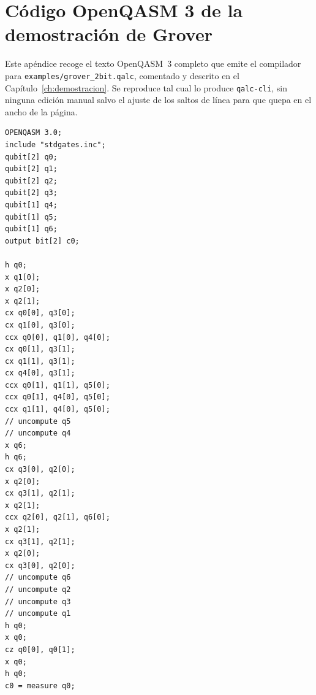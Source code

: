 \chapter{Código OpenQASM 3 de la demostración de Grover}
\label{ch:grover-qasm}

Este apéndice recoge el texto OpenQASM~3 completo que emite el compilador para \lstinline|examples/grover_2bit.qalc|, comentado y descrito en el Capítulo~\ref{ch:demostracion}. Se reproduce tal cual lo produce \lstinline|qalc-cli|, sin ninguna edición manual salvo el ajuste de los saltos de línea para que quepa en el ancho de la página.

\begin{lstlisting}[language={}, caption=Salida OpenQASM 3 completa de la demostración de Grover]
OPENQASM 3.0;
include "stdgates.inc";
qubit[2] q0;
qubit[2] q1;
qubit[2] q2;
qubit[2] q3;
qubit[1] q4;
qubit[1] q5;
qubit[1] q6;
output bit[2] c0;

h q0;
x q1[0];
x q2[0];
x q2[1];
cx q0[0], q3[0];
cx q1[0], q3[0];
ccx q0[0], q1[0], q4[0];
cx q0[1], q3[1];
cx q1[1], q3[1];
cx q4[0], q3[1];
ccx q0[1], q1[1], q5[0];
ccx q0[1], q4[0], q5[0];
ccx q1[1], q4[0], q5[0];
// uncompute q5
// uncompute q4
x q6;
h q6;
cx q3[0], q2[0];
x q2[0];
cx q3[1], q2[1];
x q2[1];
ccx q2[0], q2[1], q6[0];
x q2[1];
cx q3[1], q2[1];
x q2[0];
cx q3[0], q2[0];
// uncompute q6
// uncompute q2
// uncompute q3
// uncompute q1
h q0;
x q0;
cz q0[0], q0[1];
x q0;
h q0;
c0 = measure q0;
\end{lstlisting}
